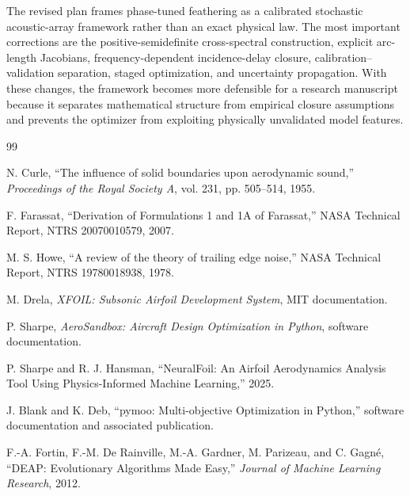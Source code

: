 \documentclass[11pt]{article}
\begin{document}
The revised plan frames phase-tuned feathering as a calibrated stochastic acoustic-array framework rather than an exact physical law. The most important corrections are the positive-semidefinite cross-spectral construction, explicit arc-length Jacobians, frequency-dependent incidence-delay closure, calibration--validation separation, staged optimization, and uncertainty propagation. With these changes, the framework becomes more defensible for a research manuscript because it separates mathematical structure from empirical closure assumptions and prevents the optimizer from exploiting physically unvalidated model features.

\begin{thebibliography}{99}

N. Curle,
``The influence of solid boundaries upon aerodynamic sound,''
\emph{Proceedings of the Royal Society A},
vol. 231, pp. 505--514, 1955.

F. Farassat,
``Derivation of Formulations 1 and 1A of Farassat,''
NASA Technical Report, NTRS 20070010579, 2007.

M. S. Howe,
``A review of the theory of trailing edge noise,''
NASA Technical Report, NTRS 19780018938, 1978.

M. Drela,
\emph{XFOIL: Subsonic Airfoil Development System},
MIT documentation.

P. Sharpe,
\emph{AeroSandbox: Aircraft Design Optimization in Python},
software documentation.

P. Sharpe and R. J. Hansman,
``NeuralFoil: An Airfoil Aerodynamics Analysis Tool Using Physics-Informed Machine Learning,'' 2025.

J. Blank and K. Deb,
``pymoo: Multi-objective Optimization in Python,''
software documentation and associated publication.

F.-A. Fortin, F.-M. De Rainville, M.-A. Gardner, M. Parizeau, and C. Gagné,
``DEAP: Evolutionary Algorithms Made Easy,''
\emph{Journal of Machine Learning Research}, 2012.

\end{thebibliography}
\end{document}
